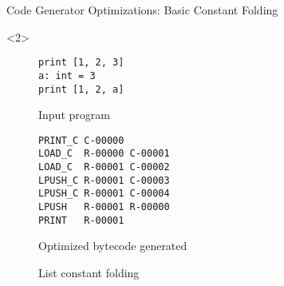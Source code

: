 \begin{frame}[fragile]{Code Generator Optimizations: Basic Constant Folding}
    \begin{onlyenv}<2>
        \begin{figure}[H]
	        \centering
            \begin{subtable}{0.3\textwidth}
                \begin{verbatim}
print [1, 2, 3]
a: int = 3
print [1, 2, a]
                \end{verbatim}
		    \caption{Input program}
	        \end{subtable}
	        \begin{subtable}{0.6\textwidth}
                \begin{verbatim}
PRINT_C C-00000
LOAD_C  R-00000 C-00001
LOAD_C  R-00001 C-00002
LPUSH_C R-00001 C-00003
LPUSH_C R-00001 C-00004
LPUSH   R-00001 R-00000
PRINT   R-00001
                \end{verbatim}
            \caption{Optimized bytecode generated}
	        \end{subtable}
        \caption{List constant folding}
        \end{figure}
    \end{onlyenv}
\end{frame}

